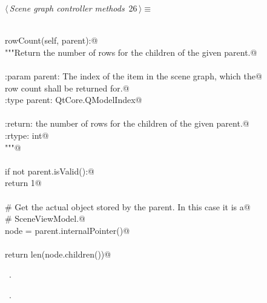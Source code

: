 \documentclass[
    a4paper,      %
    10pt,         %
    openright,    %
    notitlepage,  %
    parskip=half, %
]{scrreprt}       %
\theoremstyle{definition}                    %
\begin{document}
\begin{flushleft} \small
\begin{minipage}{\linewidth}\label{scrap22}\raggedright\small
{} $\langle\,${\itshape Scene graph controller methods}\nobreak\ {\footnotesize {26}}$\,\rangle\equiv$
\vspace{-1ex}
\begin{list}{}{} \item
\mbox{}\lstinline@@\\
\mbox{}\lstinline@def rowCount(self, parent):@\\
\mbox{}\lstinline@    """Return the number of rows for the children of the given parent.@\\
\mbox{}\lstinline@@\\
\mbox{}\lstinline@    :param parent: The index of the item in the scene graph, which the@\\
\mbox{}\lstinline@                    row count shall be returned for.@\\
\mbox{}\lstinline@    :type  parent: QtCore.QModelIndex@\\
\mbox{}\lstinline@@\\
\mbox{}\lstinline@    :return: the number of rows for the children of the given parent.@\\
\mbox{}\lstinline@    :rtype:  int@\\
\mbox{}\lstinline@    """@\\
\mbox{}\lstinline@@\\
\mbox{}\lstinline@    if not parent.isValid():@\\
\mbox{}\lstinline@        return 1@\\
\mbox{}\lstinline@@\\
\mbox{}\lstinline@    # Get the actual object stored by the parent. In this case it is a@\\
\mbox{}\lstinline@    # SceneViewModel.@\\
\mbox{}\lstinline@    node = parent.internalPointer()@\\
\mbox{}\lstinline@@\\
\mbox{}\lstinline@    return len(node.children())@\\
\mbox{}\lstinline@@{\NWsep}
\end{list}
\vspace{-1.5ex}
\footnotesize
\begin{list}{}{\setlength{\itemsep}{-\parsep}\setlength{\itemindent}{-\leftmargin}}
\item \NWtxtMacroDefBy\ .
\item \NWtxtMacroRefIn\ .

\item{}
\end{list}
\end{minipage}\vspace{4ex}
\end{flushleft}
\end{document}
